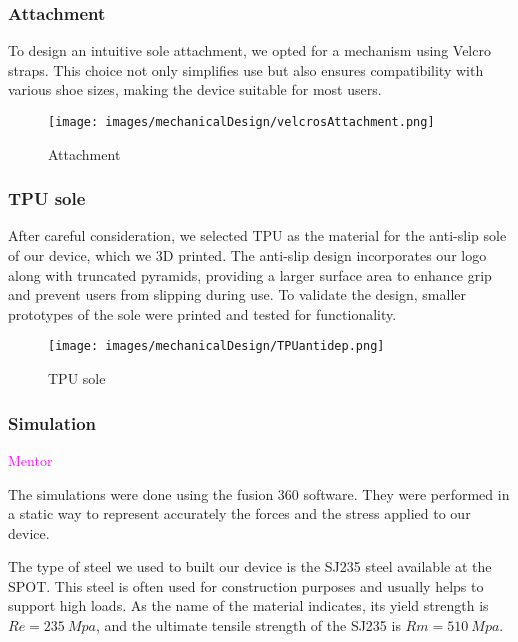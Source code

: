 \documentclass[lettersize,journal]{IEEEtran}
\begin{document}
\subsubsection{Attachment }\textcolor{magenta}{}

To design an intuitive sole attachment, we opted for a mechanism using Velcro straps. This choice not only simplifies use but also ensures compatibility with various shoe sizes, making the device suitable for most users.

\begin{figure}[!ht]
\centering
\texttt{[image: images/mechanicalDesign/velcrosAttachment.png]}
\caption{Attachment}
\label{straps}
\end{figure}

\subsubsection{TPU sole }\textcolor{magenta}{}

After careful consideration, we selected TPU as the material for the anti-slip sole of our device, which we 3D printed. The anti-slip design incorporates our logo along with truncated pyramids, providing a larger surface area to enhance grip and prevent users from slipping during use. To validate the design, smaller prototypes of the sole were printed and tested for functionality.


\begin{figure}[!ht]
\centering
\texttt{[image: images/mechanicalDesign/TPUantidep.png]}
\caption{TPU sole}
\label{TPUsole}
\end{figure}

\subsubsection{Simulation }\textcolor{magenta}{Mentor}

The simulations were done using the fusion 360 software. They were performed in a static way to represent accurately the forces and the stress applied to our device. 


The type of steel we used to built our device is the SJ235 \cite{SJ235} steel available at the SPOT. This steel is often used for construction purposes and usually helps to support high loads. As the name of the material indicates, its yield strength is $Re = \SI{235}{Mpa}$, and the ultimate tensile strength of the SJ235 is $Rm = \SI{510}{Mpa}$. 
\end{document}
